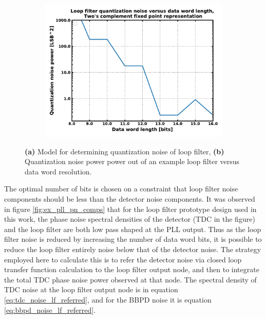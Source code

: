 
	\begin{figure}[htb!]
	    \centering
	    \begin{subfigure}{0.5\textwidth}
	        \centering
	        \center
	        \caption{ }
	        \label{fig:lf_quant_noise_model}
	    \end{subfigure}%
	    \begin{subfigure}{0.5\textwidth}
	        \centering
	       \center\includegraphics[width=1\textwidth, angle=0]{figs/lf_quant_noise.pdf}
	        \caption{ }
	        \label{fig:lf_quant_mse}
	    \end{subfigure}
	    \label{fig:lf_quant_noise_opt}
	    \caption{\textbf{(a)} Model for determining quantization noise of loop filter, \textbf{(b)} Quantization noise power power out of an example loop filter versus data word resolution.}
	\end{figure}
The optimal number of bits is chosen on a constraint that loop filter noise components should be less than the detector noise components. It was observed in figure \ref{fig:ex_pll_pn_comps} that for the loop filter prototype design used in this work, the phase noise spectral densities of the detector (TDC in the figure) and the loop filter are both low pass shaped at the PLL output. Thus as the loop filter noise is reduced by increasing the number of data word bits, it is possible to reduce the loop filter entirely noise below that of the detector noise. The strategy employed here to calculate this is to refer the detector noise via closed loop transfer function calculation to the loop filter output node, and then to integrate the total TDC phase noise power observed at that node. The spectral density of TDC noise at the loop filter output node is in equation \ref{eq:tdc_noise_lf_referred}, and for the BBPD noise it is equation \ref{eq:bbpd_noise_lf_referred}.
